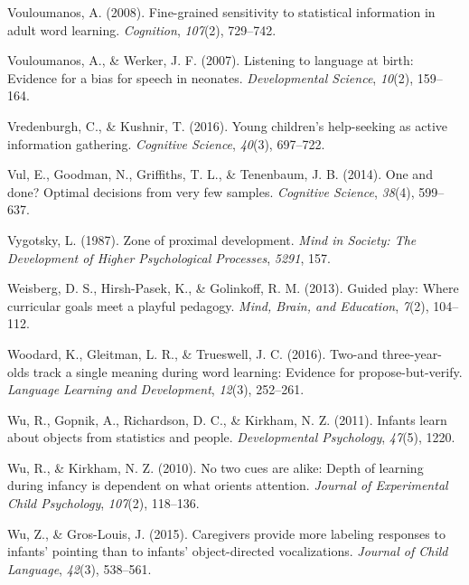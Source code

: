 \documentclass[oneside]{report}
\begin{document}
\leavevmode\hypertarget{ref-vouloumanos2008fine}{}%
Vouloumanos, A. (2008). Fine-grained sensitivity to statistical
information in adult word learning. \emph{Cognition}, \emph{107}(2),
729--742.

\leavevmode\hypertarget{ref-vouloumanos2007listening}{}%
Vouloumanos, A., \& Werker, J. F. (2007). Listening to language at
birth: Evidence for a bias for speech in neonates. \emph{Developmental
Science}, \emph{10}(2), 159--164.

\leavevmode\hypertarget{ref-vredenburgh2016young}{}%
Vredenburgh, C., \& Kushnir, T. (2016). Young children's help-seeking as
active information gathering. \emph{Cognitive Science}, \emph{40}(3),
697--722.

\leavevmode\hypertarget{ref-vul2014}{}%
Vul, E., Goodman, N., Griffiths, T. L., \& Tenenbaum, J. B. (2014). One
and done? Optimal decisions from very few samples. \emph{Cognitive
Science}, \emph{38}(4), 599--637.

\leavevmode\hypertarget{ref-vygotsky1987zone}{}%
Vygotsky, L. (1987). Zone of proximal development. \emph{Mind in
Society: The Development of Higher Psychological Processes},
\emph{5291}, 157.

\leavevmode\hypertarget{ref-weisberg2013guided}{}%
Weisberg, D. S., Hirsh-Pasek, K., \& Golinkoff, R. M. (2013). Guided
play: Where curricular goals meet a playful pedagogy. \emph{Mind, Brain,
and Education}, \emph{7}(2), 104--112.

\leavevmode\hypertarget{ref-woodard2016two}{}%
Woodard, K., Gleitman, L. R., \& Trueswell, J. C. (2016). Two-and
three-year-olds track a single meaning during word learning: Evidence
for propose-but-verify. \emph{Language Learning and Development},
\emph{12}(3), 252--261.

\leavevmode\hypertarget{ref-wu2011infants}{}%
Wu, R., Gopnik, A., Richardson, D. C., \& Kirkham, N. Z. (2011). Infants
learn about objects from statistics and people. \emph{Developmental
Psychology}, \emph{47}(5), 1220.

\leavevmode\hypertarget{ref-wu2010no}{}%
Wu, R., \& Kirkham, N. Z. (2010). No two cues are alike: Depth of
learning during infancy is dependent on what orients attention.
\emph{Journal of Experimental Child Psychology}, \emph{107}(2),
118--136.

\leavevmode\hypertarget{ref-wu2015caregivers}{}%
Wu, Z., \& Gros-Louis, J. (2015). Caregivers provide more labeling
responses to infants' pointing than to infants' object-directed
vocalizations. \emph{Journal of Child Language}, \emph{42}(3), 538--561.
\end{document}
